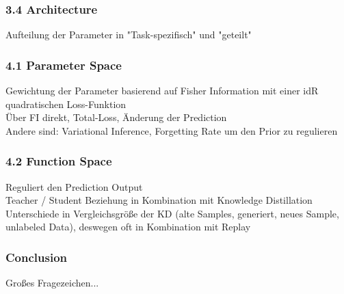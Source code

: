 \documentclass{beamer}
\begin{document}
\begin{frame}
	\frametitle{3.4 Architecture}
	Aufteilung der Parameter in "Task-spezifisch" und "geteilt"
	
\end{frame}
\begin{frame}
	\frametitle{4.1 Parameter Space}
	Gewichtung der Parameter basierend auf Fisher Information mit einer idR quadratischen Loss-Funktion
	\\
	Über FI direkt, Total-Loss, Änderung der Prediction
	\\
	\vspace{0.5cm}
	Andere sind: Variational Inference, Forgetting Rate um den Prior zu regulieren
\end{frame}
\begin{frame}
	\frametitle{4.2 Function Space}
	Reguliert den Prediction Output
	\\
	Teacher / Student Beziehung  in Kombination mit Knowledge Distillation 
	\vspace{0.5cm}
	Unterschiede in Vergleichsgröße der KD (alte Samples, generiert, neues Sample, unlabeled Data), deswegen oft in Kombination mit Replay
\end{frame}
\begin{frame}
	\frametitle{Conclusion}
	Großes Fragezeichen... 
\end{frame}
\end{document}
